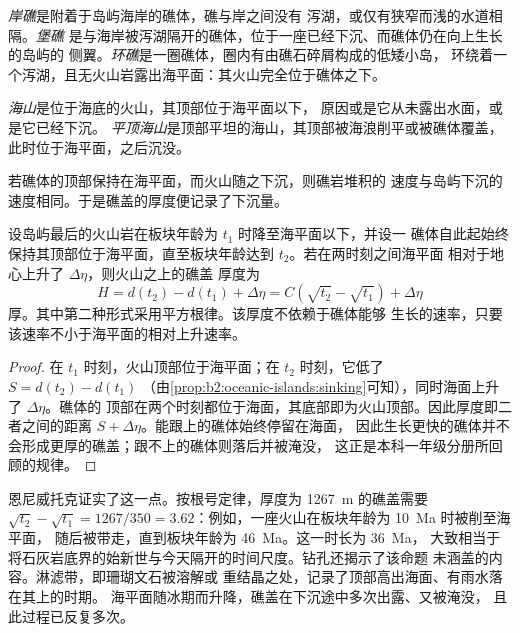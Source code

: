 \begin{definition}[岸礁；堡礁；环礁]\label{def:b2:oceanic-islands:reefs}
\emph{岸礁}是附着于岛屿海岸的礁体，礁与岸之间没有
泻湖，或仅有狭窄而浅的水道相隔。\emph{堡礁}
是与海岸被泻湖隔开的礁体，位于一座已经下沉、而礁体仍在向上生长的岛屿的
侧翼。\emph{环礁}是一圈礁体，圈内有由礁石碎屑构成的低矮小岛，
环绕着一个泻湖，且无火山岩露出海平面：其火山完全位于礁体之下。
\end{definition}

\begin{definition}[海山；平顶海山]\label{def:b2:oceanic-islands:seamount}
\emph{海山}是位于海底的火山，其顶部位于海平面以下，
原因或是它从未露出水面，或是它已经下沉。
\emph{平顶海山}是顶部平坦的海山，其顶部被海浪削平或被礁体覆盖，
此时位于海平面，之后沉没。
\end{definition}

若礁体的顶部保持在海平面，而火山随之下沉，则礁岩堆积的
速度与岛屿下沉的速度相同。于是礁盖的厚度便记录了下沉量。

\begin{proposition}[礁盖的厚度]\label{prop:b2:oceanic-islands:cap}
设岛屿最后的火山岩在板块年龄为 $t_1$ 时降至海平面以下，并设一
礁体自此起始终保持其顶部位于海平面，直至板块年龄达到 $t_2$。若在两时刻之间海平面
相对于地心上升了 $\Delta\eta$，则火山之上的礁盖
厚度为
\[
H = d(t_2) - d(t_1) + \Delta\eta = C\left(\sqrt{t_2} - \sqrt{t_1}\right) + \Delta\eta
\]
厚。其中第二种形式采用平方根律。该厚度不依赖于礁体能够
生长的速率，只要该速率不小于海平面的相对上升速率。
\end{proposition}

\begin{proof}
在 $t_1$ 时刻，火山顶部位于海平面；在 $t_2$ 时刻，它低了 $S = d(t_2) - d(t_1)$
（由\cref{prop:b2:oceanic-islands:sinking}可知），同时海面上升了 $\Delta\eta$。礁体的
顶部在两个时刻都位于海面，其底部即为火山顶部。因此厚度即二者之间的距离
$S + \Delta\eta$。能跟上的礁体始终停留在海面，
因此生长更快的礁体并不会形成更厚的礁盖；跟不上的礁体则落后并被淹没，
这正是本科一年级分册所回顾的规律。
\end{proof}

恩尼威托克证实了这一点。按根号定律，厚度为 \qty{1267}{m} 的礁盖需要 $\sqrt{t_2} - \sqrt{t_1} =
1267/350 = 3.62$：例如，一座火山在板块年龄为 \qty{10}{Ma} 时被削至海平面，
随后被带走，直到板块年龄为 \qty{46}{Ma}。这一时长为 \qty{36}{Ma}，
大致相当于将石灰岩底界的始新世与今天隔开的时间尺度。钻孔还揭示了该命题
未涵盖的内容。淋滤带，即珊瑚文石被溶解或
重结晶之处，记录了顶部高出海面、有雨水落在其上的时期。
海平面随冰期而升降，礁盖在下沉途中多次出露、又被淹没，
且此过程已反复多次。

